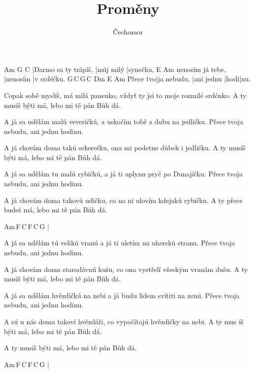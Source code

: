 \documentclass{song}
\title{Proměny}
\author{Čechomor}
\begin{document}
\begin{multicols}{2}

\strophe
Am                   G         C
|Darmo sa ty trápíš, |můj milý |synečku,
                 E\7      Am
nenosím já tebe, |nenosím |v srdéčku.
         G\,C\,G\,C  Dm         E\7  Am
Přece tvo|ja nebudu, |ani jednu |hodi|nu.
\endstrophe

\strophe*
Copak sobě myslíš, má milá panenko,
vždyť ty jsi to moje rozmilé srdénko.
A ty musíš býti má, lebo mi tě pán Bůh dá.
\endstrophe

\strophe*
A já sa udělám malú veveričkú,
a uskočím tobě z dubu na jedličku.
Přece tvoja nebudu, ani jednu hodinu.
\endstrophe

\strophe*
A já chovám doma takú sekerečku,
ona mi podetne důbek i jedličku.
A ty musíš býti má, lebo mi tě pán Bůh dá.
\endstrophe

\strophe*
A já sa udělám tu malú rybičkú,
a já ti uplynu pryč po Dunajíčku.
Přece tvoja nebudu, ani jednu hodinu.
\endstrophe

\strophe*
A já chovám doma takovú udičku,
co na ni ulovím kdejakú rybičku.
A ty přece budeš má, lebo mi tě pán Bůh dá.
\endstrophe

\strophe
Am\,F\,C\,F\,C\,G
|
\endstrophe

\columnbreak

\strophe*
A já sa udělám tú velikú vranú
a já ti uletím na uherskú stranu.
Přece tvoja nebudu, ani jednu hodinu.
\endstrophe

\strophe*
A já chovám doma starodávnú kušu,
co ona vystřelí všeckým vranám dušu.
A ty musíš býti má, lebo mi tě pán Bůh dá.
\endstrophe

\strophe*
A já sa udělám hvězdičkú na nebi
a já budu lidem svítiti na zemi.
Přece tvoja nebudu, ani jednu hodinu.
\endstrophe

\strophe*
A sú u nás doma takoví hvězdáři,
co vypočítajú hvězdičky na nebi.
A ty mus íš býti má, lebo mi tě pán Bůh dá.
\endstrophe

\strophe*
A ty musíš býti má, lebo mi tě pán Bůh dá.
\endstrophe

\strophe
Am\,F\,C\,F\,C\,G
|
\endstrophe

\end{multicols}
\end{document}
